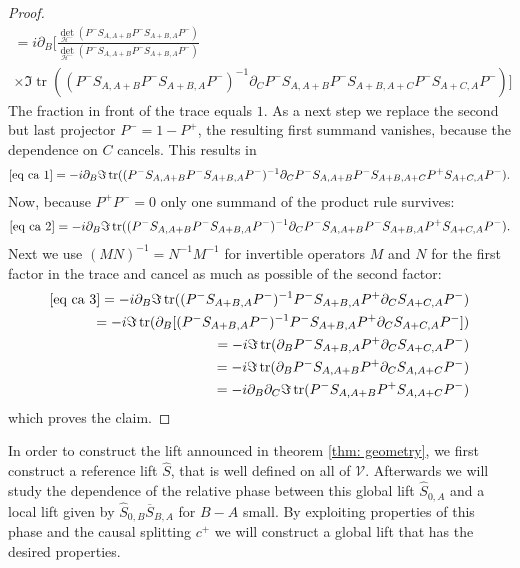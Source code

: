 \documentclass[b5paper,draft,openbib,12pt]{memoir}
\DeclareMathOperator{\tr}{tr}
\begin{document}
\begin{proof}
\begin{align}
=i\partial_B \Big[\frac{\det_{\mathcal{H}^-}(P^-S_{A,A+B}P^-S_{A+B,A}P^-)}{\det_{\mathcal{H}^-}(P^-S_{A,A+B}P^-S_{A+B,A}P^-)}\\
\times \Im  \tr ((P^-S_{A,A+B}P^-S_{A+B,A}P^-)^{-1}\partial_C P^-S_{A,A+B}P^-S_{A+B,A+C}P^- S_{A+C,A}P^-)\Big]\label{eq ca 1}
\end{align}
The fraction in front of the trace equals \(1\). As a next step we replace the second but last projector \(P^-=1-P^+\), the resulting first summand vanishes,
because the dependence on \(C\) cancels. This results in 
\begin{align}
\eqref{eq ca 1}=-i\partial_B \Im \tr((P^-S_{A,A+B}P^-S_{A+B,A}P^-)^{-1}\partial_C P^-S_{A,A+B}P^-S_{A+B,A+C}P^+ S_{A+C,A}P^-).\label{eq ca 2}
\end{align}
Now, because \(P^+P^-=0\) only one summand of the product rule survives:
\begin{align}
\eqref{eq ca 2}=-i\partial_B \Im \tr((P^-S_{A,A+B}P^-S_{A+B,A}P^-)^{-1}\partial_C P^-S_{A,A+B}P^-S_{A+B,A}P^+ S_{A+C,A}P^-).\label{eq ca 3}
\end{align}
Next we use 
\((M N )^{-1}= N^{-1} M^{-1}\) for invertible operators \(M\) and \(N\) for the first factor in the trace and cancel as much as possible of
the second factor:
\begin{align}
\eqref{eq ca 3}=-i\partial_B \Im \tr((P^-S_{A+B,A}P^-)^{-1}  P^-S_{A+B,A}P^+ \partial_C S_{A+C,A}P^-)\\
=-i \Im \tr(\partial_B[(P^-S_{A+B,A}P^-)^{-1}  P^-S_{A+B,A}P^+ \partial_C S_{A+C,A}P^-])\\
=-i \Im \tr(\partial_B  P^-S_{A+B,A}P^+ \partial_C S_{A+C,A}P^-)\\
=-i \Im \tr(\partial_B  P^-S_{A,A+B}P^+ \partial_C S_{A,A+C}P^-)\\
=-i \partial_B\partial_C\Im \tr(  P^-S_{A,A+B}P^+  S_{A,A+C}P^-)
\end{align}
which proves the claim.

\end{proof}



In order to construct the lift announced in theorem \ref{thm: geometry}, we first construct a reference lift \(\hat{S}\), that is well defined on all of \(\mathcal{V}\). 
Afterwards we will study the dependence of the relative phase between 
this global lift \(\hat{S}_{0,A}\) and a local lift given by \(\hat{S}_{0,B}\overline{S}_{B,A}\) for \(B-A\) small. 
By exploiting properties of this phase and the causal splitting \(c^+\) we will construct a global lift that has the desired properties.
\end{document}
